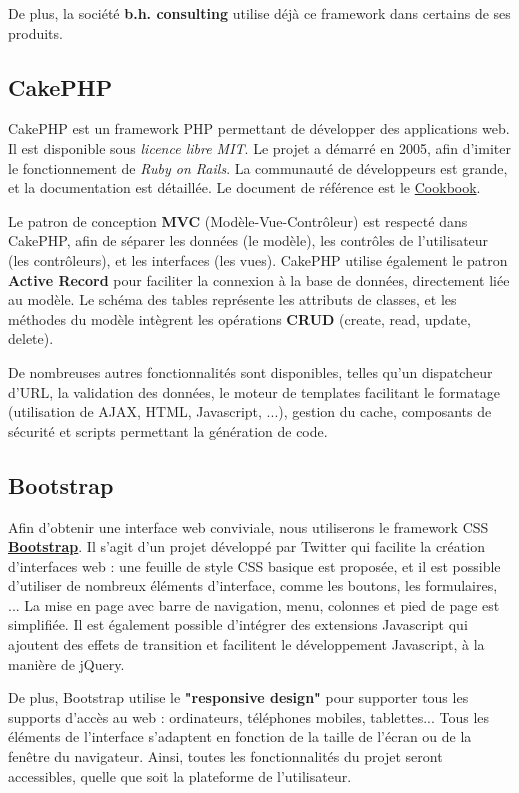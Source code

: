 De plus, la société \textbf{b.h. consulting} utilise déjà ce framework dans certains de ses produits.

\subsection{CakePHP}

CakePHP est un framework PHP permettant de développer des applications web. Il est disponible sous \emph{licence libre MIT}. Le projet a démarré en 2005, afin d'imiter le fonctionnement de \emph{Ruby on Rails}. La communauté de développeurs est grande, et la documentation est détaillée. Le document de référence est le \href{http://book.cakephp.org/fr/view/876/The-Manual}{Cookbook}.

Le patron de conception \textbf{MVC} (Modèle-Vue-Contrôleur) est respecté dans CakePHP, afin de séparer les données (le modèle), les contrôles de l'utilisateur (les contrôleurs), et les interfaces (les vues). CakePHP utilise également le patron \textbf{Active Record} pour faciliter la connexion à la base de données, directement liée au modèle. Le schéma des tables représente les attributs de classes, et les méthodes du modèle intègrent les opérations \textbf{CRUD} (create, read, update, delete).

De nombreuses autres fonctionnalités sont disponibles, telles qu'un dispatcheur d'URL, la validation des données, le moteur de templates facilitant le formatage (utilisation de AJAX, HTML, Javascript, ...), gestion du cache, composants de sécurité et scripts permettant la génération de code.

\subsection{Bootstrap}

Afin d'obtenir une interface web conviviale, nous utiliserons le framework CSS \href{http://twitter.github.com/bootstrap/}{\textbf{Bootstrap}}. Il s'agit d'un projet développé par Twitter qui facilite la création d'interfaces web : une feuille de style CSS basique est proposée, et il est possible d'utiliser de nombreux éléments d'interface, comme les boutons, les formulaires, ... La mise en page avec barre de navigation, menu, colonnes et pied de page est simplifiée. Il est également possible d'intégrer des extensions Javascript qui ajoutent des effets de transition et facilitent le développement Javascript, à la manière de jQuery.

De plus, Bootstrap utilise le \textbf{"responsive design"} pour supporter tous les supports d'accès au web : ordinateurs, téléphones mobiles, tablettes... Tous les éléments de l'interface s'adaptent en fonction de la taille de l'écran ou de la fenêtre du navigateur. Ainsi, toutes les fonctionnalités du projet seront accessibles, quelle que soit la plateforme de l'utilisateur.

